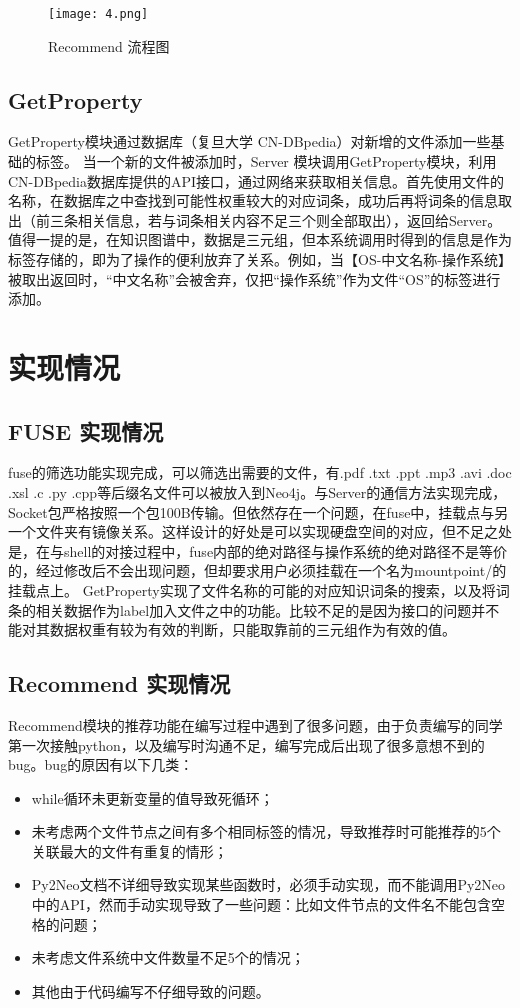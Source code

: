 \documentclass[UTF8]{ctexart}
\begin{document}
\begin{figure}
\centering\texttt{[image: 4.png]}
\caption{Recommend 流程图}
\end{figure}

\subsection{GetProperty}
GetProperty模块通过数据库（复旦大学 CN-DBpedia）对新增的文件添加一些基础的标签。
当一个新的文件被添加时，Server 模块调用GetProperty模块，利用CN-DBpedia数据库提供的API接口，通过网络来获取相关信息。首先使用文件的名称，在数据库之中查找到可能性权重较大的对应词条，成功后再将词条的信息取出（前三条相关信息，若与词条相关内容不足三个则全部取出），返回给Server。值得一提的是，在知识图谱中，数据是三元组，但本系统调用时得到的信息是作为标签存储的，即为了操作的便利放弃了关系。例如，当【OS-中文名称-操作系统】被取出返回时，“中文名称”会被舍弃，仅把“操作系统”作为文件“OS”的标签进行添加。

\section{实现情况}
\subsection{FUSE 实现情况}
fuse的筛选功能实现完成，可以筛选出需要的文件，有.pdf .txt .ppt .mp3 .avi .doc .xsl .c .py .cpp等后缀名文件可以被放入到Neo4j。与Server的通信方法实现完成，Socket包严格按照一个包100B传输。但依然存在一个问题，在fuse中，挂载点与另一个文件夹有镜像关系。这样设计的好处是可以实现硬盘空间的对应，但不足之处是，在与shell的对接过程中，fuse内部的绝对路径与操作系统的绝对路径不是等价的，经过修改后不会出现问题，但却要求用户必须挂载在一个名为mountpoint/的挂载点上。
GetProperty实现了文件名称的可能的对应知识词条的搜索，以及将词条的相关数据作为label加入文件之中的功能。比较不足的是因为接口的问题并不能对其数据权重有较为有效的判断，只能取靠前的三元组作为有效的值。

\subsection{Recommend 实现情况}
Recommend模块的推荐功能在编写过程中遇到了很多问题，由于负责编写的同学第一次接触python，以及编写时沟通不足，编写完成后出现了很多意想不到的bug。bug的原因有以下几类：

\begin{itemize}
  \item while循环未更新变量的值导致死循环；
  \item 未考虑两个文件节点之间有多个相同标签的情况，导致推荐时可能推荐的5个关联最大的文件有重复的情形；
   \item Py2Neo文档不详细导致实现某些函数时，必须手动实现，而不能调用Py2Neo中的API，然而手动实现导致了一些问题：比如文件节点的文件名不能包含空格的问题；
  \item 未考虑文件系统中文件数量不足5个的情况；
  \item 其他由于代码编写不仔细导致的问题。
\end{itemize}
\end{document}
